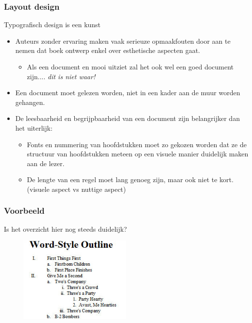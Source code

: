 \documentclass{beamer}
\begin{document}
\begin{frame}
\frametitle{Layout design}
Typografisch design is een kunst
\begin{itemize}[<+->]
 \item <1-> Auteurs zonder ervaring maken vaak serieuze opmaakfouten door aan te nemen dat boek ontwerp enkel over esthetische aspecten gaat.
    \begin{itemize}
    \item Als een document en mooi uitziet zal het ook wel een goed document zijn.... \textit{dit is niet waar!}
    \end{itemize}
 \item <2-> Een document moet gelezen worden, niet in een kader aan de muur worden gehangen.
 \item <3-> De leesbaarheid en begrijpbaarheid van een document zijn belangrijker dan het uiterlijk:
    \begin{itemize}
    \item Fonts en nummering van hoofdstukken moet zo gekozen worden dat ze de structuur van hoofdstukken meteen op een visuele manier duidelijk maken aan de lezer.
    \item De lengte van een regel moet lang genoeg zijn, maar ook niet te kort. (visuele aspect vs nuttige aspect)
    \end{itemize}
\end{itemize}
\end{frame}


\begin{frame}
\frametitle{Voorbeeld}
Is het overzicht hier nog steeds duidelijk?

\begin{figure}[h] 
  \includegraphics[width=0.5\textwidth]{images/indent.jpg}
\end{figure}
\end{frame}
\end{document}
